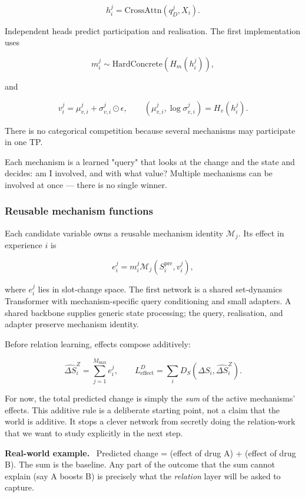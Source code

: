 \documentclass[11pt]{article}
\newenvironment{plainword}{%
  \par\medskip\noindent\begin{minipage}{\textwidth}%
  \color{gray!75!black}\small\itshape
}{%
  \end{minipage}\par\medskip}
\newenvironment{example}{%
  \par\smallskip\noindent\begin{minipage}{\textwidth}%
  \color{teal!60!black}\small
  \textbf{\color{teal!70!black}Real-world example.}\
}{%
  \end{minipage}\par\smallskip}
\begin{document}
\[
\boxed{h_i^j=\mathrm{CrossAttn}(q_D^j,X_i).}
\]

Independent heads predict participation and realisation. The first implementation uses

\[
m_i^j\sim\mathrm{HardConcrete}(H_m(h_i^j)),
\]

and

\[
v_i^j=\mu_{v,i}^j+\sigma_{v,i}^j\odot\epsilon,
\qquad
(\mu_{v,i}^j,\log\sigma_{v,i}^j)=H_v(h_i^j).
\]

There is no categorical competition because several mechanisms may participate in one TP.

\begin{plainword}
Each mechanism is a learned "query" that looks at the change and the state and decides: am I involved, and with what value? Multiple
mechanisms can be involved at once --- there is no single winner.
\end{plainword}

\subsubsection*{Reusable mechanism functions}

Each candidate variable owns a reusable mechanism identity $\mathcal M_j$. Its effect in experience $i$ is

\[
\boxed{e_i^j=m_i^j\mathcal M_j(S_i^{\mathrm{pre}},v_i^j),}
\]

where $e_i^j$ lies in slot-change space. The first network is a shared set-dynamics Transformer with mechanism-specific query
conditioning and small adapters. A shared backbone supplies generic state processing; the query, realisation, and adapter preserve
mechanism identity.

Before relation learning, effects compose additively:

\[
\boxed{\widehat{\Delta S}_i^Z=\sum_{j=1}^{M_{\max}}e_i^j,}
\qquad
\boxed{L_{\mathrm{effect}}^D=\sum_iD_S(\Delta S_i,\widehat{\Delta S}_i^Z).}
\]

\begin{plainword}
For now, the total predicted change is simply the \emph{sum} of the active mechanisms' effects. This additive rule is a deliberate
starting point, not a claim that the world is additive. It stops a clever network from secretly doing the relation-work that we want
to study explicitly in the next step.
\end{plainword}

\begin{example}
Predicted change = (effect of drug A) + (effect of drug B). The sum is the baseline. Any part of the outcome that the sum cannot
explain (say A boosts B) is precisely what the \emph{relation} layer will be asked to capture.
\end{example}
\end{document}
